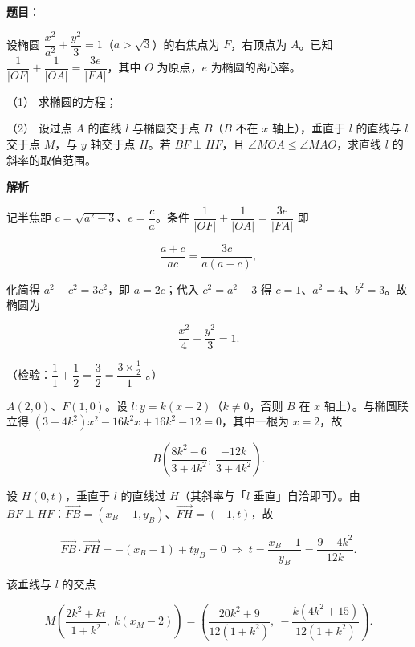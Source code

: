\begin{answer}

\textbf{题目}：

设椭圆 \(\dfrac{x^{2}}{a^{2}}+\dfrac{y^{2}}{3}=1\)（\(a>\sqrt{3}\)）的右焦点为 \(F\)，右顶点为 \(A\)。已知 \(\dfrac{1}{|OF|}+\dfrac{1}{|OA|}=\dfrac{3e}{|FA|}\)，其中 \(O\) 为原点，\(e\) 为椭圆的离心率。

（1） 求椭圆的方程；

（2） 设过点 \(A\) 的直线 \(l\) 与椭圆交于点 \(B\)（\(B\) 不在 \(x\) 轴上），垂直于 \(l\) 的直线与 \(l\) 交于点 \(M\)，与 \(y\) 轴交于点 \(H\)。若 \(BF\perp HF\)，且 \(\angle MOA\leqslant\angle MAO\)，求直线 \(l\) 的斜率的取值范围。

\textbf{解析}


记半焦距 \(c=\sqrt{a^{2}-3}\)、\(e=\dfrac{c}{a}\)。条件 \(\dfrac{1}{|OF|}+\dfrac{1}{|OA|}=\dfrac{3e}{|FA|}\) 即

\nopagebreak[4]
\[
\frac{a+c}{ac}=\frac{3c}{a(a-c)},
\]

化简得 \(a^{2}-c^{2}=3c^{2}\)，即 \(a=2c\)；代入 \(c^{2}=a^{2}-3\) 得 \(c=1\)、\(a^{2}=4\)、\(b^{2}=3\)。故椭圆为

\nopagebreak[4]
\[
\frac{x^{2}}{4}+\frac{y^{2}}{3}=1.
\]

（检验：\(\dfrac{1}{1}+\dfrac{1}{2}=\dfrac{3}{2}=\dfrac{3\times\frac{1}{2}}{1}\) 。）


\(A(2,0)\)、\(F(1,0)\)。设 \(l:y=k(x-2)\)（\(k\neq0\)，否则 \(B\) 在 \(x\) 轴上）。与椭圆联立得 \((3+4k^{2})x^{2}-16k^{2}x+16k^{2}-12=0\)，其中一根为 \(x=2\)，故

\nopagebreak[4]
\[
B\left(\frac{8k^{2}-6}{3+4k^{2}},\ \frac{-12k}{3+4k^{2}}\right).
\]

设 \(H(0,t)\)，垂直于 \(l\) 的直线过 \(H\)（其斜率与「\(l\) 垂直」自洽即可）。由 \(BF\perp HF\)：\(\overrightarrow{FB}=(x_{B}-1,y_{B})\)、\(\overrightarrow{FH}=(-1,t)\)，故

\nopagebreak[4]
\[
\overrightarrow{FB}\cdot\overrightarrow{FH}=-(x_{B}-1)+t y_{B}=0\ \Longrightarrow\ t=\frac{x_{B}-1}{y_{B}}=\frac{9-4k^{2}}{12k}.
\]

该垂线与 \(l\) 的交点

\nopagebreak[4]
\[
M\left(\frac{2k^{2}+kt}{1+k^{2}},\ k(x_{M}-2)\right)=\left(\frac{20k^{2}+9}{12(1+k^{2})},\ -\frac{k(4k^{2}+15)}{12(1+k^{2})}\right).
\]


\end{answer}
